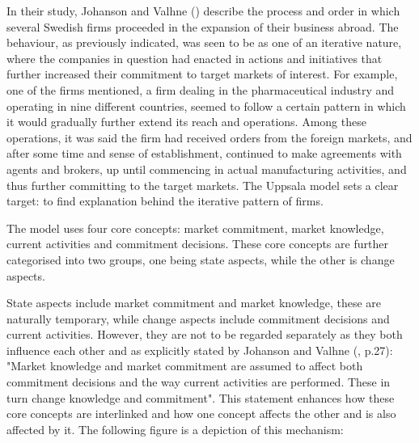 \documentclass[11pt,a4paper]{article}
\begin{document}
\par
In their study, Johanson and Valhne (\citeyear{johansonInternationalizationProcessFirm1977}) describe the process and order in which several Swedish firms proceeded in the expansion of their business abroad. The behaviour, as previously indicated, was seen to be as one of an iterative nature, where the companies in question had enacted in actions and initiatives that further increased their commitment to target markets of interest. For example, one of the firms mentioned, a firm dealing in the pharmaceutical industry and operating in nine different countries, seemed to follow a certain pattern in which it would gradually further extend its reach and operations. Among these operations, it was said the firm had received orders from the foreign markets, and after some time and sense of establishment, continued to make agreements with agents and brokers, up until commencing in actual manufacturing activities, and thus further committing to the target markets. The Uppsala model sets a clear target: to find explanation behind the iterative pattern of firms. \par
The model uses four core concepts: market commitment, market knowledge, current activities and commitment decisions. These core concepts are further categorised into two groups, one being state aspects, while the other is change aspects. \par
State aspects include market commitment and market knowledge, these are naturally temporary, while change aspects include commitment decisions and current activities. However, they are not to be regarded separately as they both influence each other and as explicitly stated by Johanson and Valhne (\citeyear{johansonInternationalizationProcessFirm1977}, p.27): "Market knowledge and market commitment are assumed to affect both commitment decisions and
the way current activities are performed. These in turn change knowledge and commitment". This statement enhances how these core concepts are interlinked and how one concept affects the other and is also affected by it.  The following figure is a depiction of this mechanism: \\
\end{document}

